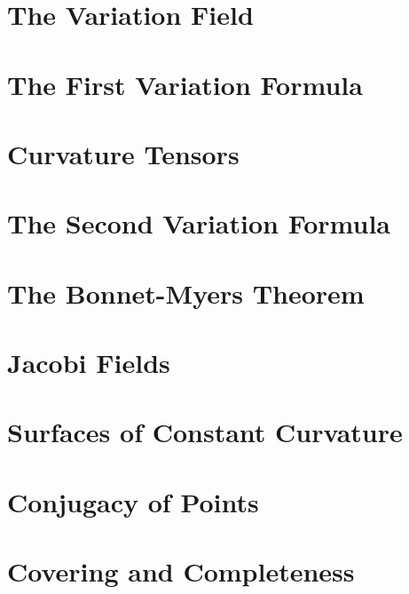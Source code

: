 \documentclass{article}
\begin{document}

\tableofcontents
\newpage

\section{The Variation Field}

\section{The First Variation Formula}

\section{Curvature Tensors}

\section{The Second Variation Formula}

\section{The Bonnet-Myers Theorem}

\section{Jacobi Fields}

\section{Surfaces of Constant Curvature}

\section{Conjugacy of Points}

\section{Covering and Completeness}
\end{document}

